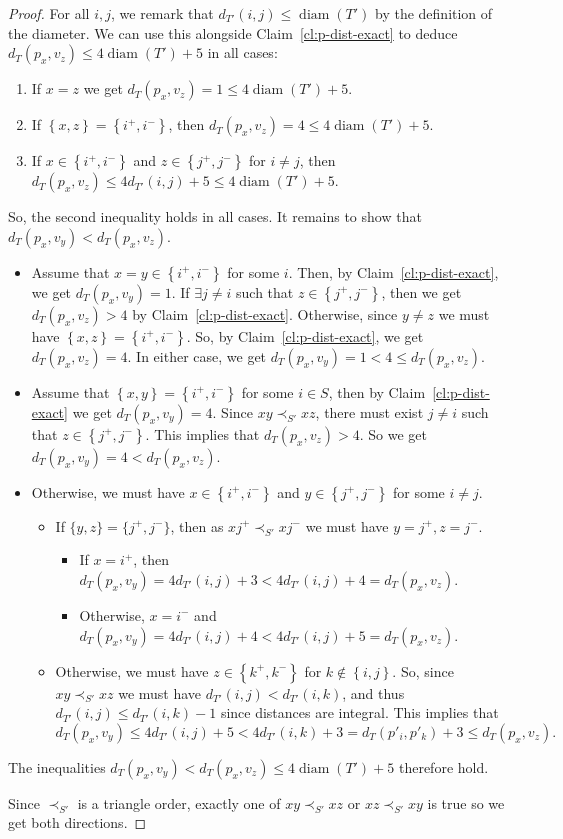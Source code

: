 \documentclass[10pt,a4paper]{amsart}
\DeclareMathOperator{\diam}{diam}
\newcommand{\set}[1]{\left\{#1\right\}}
\begin{document}
\begin{proof}
    For all $i,j$, we remark that $d_{T'}(i,j)\leq \diam(T')$ by the definition of the diameter. We can use this alongside Claim~\ref{cl:p-dist-exact} to deduce $d_{T}(p_x,v_z)\leq 4\diam(T')+5$ in all cases:
    \begin{enumerate}
        \item If $x=z$ we get $d_{T}(p_x,v_z)=1\leq 4\diam(T')+5$. 
        \item If $\set{x,z}=\set{i^+,i^-}$, then $d_T(p_x,v_z)=4\leq 4\diam(T')+5$.
        \item If $x\in\set{i^+,i^-}$ and $z\in \set{j^+,j^-}$ for $i\neq j$, then $d_T(p_x,v_z)\leq 4d_{T'}(i,j)+5\leq 4\diam(T')+5$.
    \end{enumerate}
    
    So, the second inequality holds in all cases. It remains to show that $d_{T}(p_x,v_y)< d_{T}(p_x,v_z)$.

    \begin{itemize}
        \item Assume that $x=y\in \set{i^+,i^-}$ for some $i$. Then, by Claim~\ref{cl:p-dist-exact}, we get $d_T(p_x,v_y)=1$. If $\exists j\neq i$ such that $z\in \set{j^+,j^-}$, then we get $d_{T}(p_x,v_z)>4$ by Claim~\ref{cl:p-dist-exact}. Otherwise, since $y\neq z$ we must have $\set{x,z}=\set{i^+,i^-}$. So, by Claim~\ref{cl:p-dist-exact}, we get $d_{T}(p_x,v_z)=4$. In either case, we get $d_T(p_x,v_y)=1<4\leq d_T(p_x,v_z)$.
        \item Assume that $\set{x,y}=\set{i^+,i^-}$ for some $i\in S$, then by Claim~\ref{cl:p-dist-exact} we get $d_T(p_x,v_y)=4$. Since $xy\prec_{S'} xz$, there must exist $j\neq i$ such that $z\in \set{j^+,j^-}$. This implies that $d_T(p_x,v_z)>4$. So we get $d_{T}(p_x,v_y)=4<d_{T}(p_x,v_z)$.  
        \item Otherwise, we must have $x\in \set{i^+,i^-}$ and $y\in \set{j^+,j^-}$ for some $i\neq j$. 
        \begin{itemize}
            \item If $\{y, z\} = \{j^+, j^-\}$, then as $xj^+ \prec_{S'} xj^-$ we must have $y = j^+, z = j^-$.
            \begin{itemize}
                \item If $x=i^+$, then $d_T(p_x,v_y)=4d_{T'}(i,j)+3<4d_{T'}(i,j)+4=d_T(p_x,v_z)$.
                \item Otherwise, $x=i^-$ and $d_T(p_x,v_y)=4d_{T'}(i,j)+4<4d_{T'}(i,j)+5=d_T(p_x,v_z)$.
            \end{itemize}
            \item Otherwise, we must have $z\in \set{k^+,k^-}$ for $k\notin \set{i,j}$. So, since $xy\prec_{S'} xz$ we must have $d_{T'}(i,j)< d_{T'}(i,k)$, and thus $d_{T'}(i, j) \leq d_{T'}(i, k) - 1$ since distances are integral. 
            This implies that
            $$d_{T}(p_x,v_y)\leq 4d_{T'}(i,j)+5<4d_{T'}(i,k)+3 = d_T(p'_i, p'_k) + 3 \leq d_{T}(p_x,v_z).$$
        \end{itemize}
    \end{itemize}

    The inequalities $d_{T}(p_x,v_y)< d_{T}(p_x,v_z)\leq 4\diam(T')+5$ therefore hold.
    
    Since $\prec_{S'}$ is a triangle order, exactly one of $xy\prec_{S'} xz$ or $xz\prec_{S'} xy$ is true so we get both directions.  
\end{proof}
\end{document}
